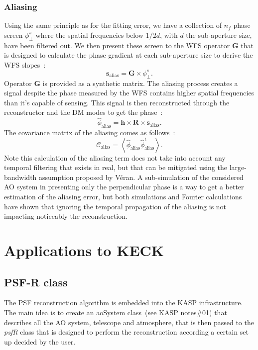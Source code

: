 \documentclass[12pt]{article}
\newcommand{\aver}[1]{\left\langle #1 \right\rangle}
\newcommand{\R}{\boldsymbol{\text{R}}}
\begin{document}
\subsubsection{Aliasing}
Using the same principle as for the fitting error, we have a collection of $n_f$ phase screen $\phi^s_\perp$ where the spatial frequencies below $1/2d$, with $d$ the sub-aperture size, have been filtered out. We then present these screen to the WFS operator $\boldsymbol{G}$ that is designed to calculate the phase gradient at each sub-aperture size to derive the WFS slopes~:
\begin{equation}
	\boldsymbol{s}_\text{alias} = \boldsymbol{G}\times\phi^s_\perp.
\end{equation}
Operator $\boldsymbol{G}$ is provided as a synthetic matrix. The aliasing process creates a signal despite the phase measured by the WFS contains higher spatial frequencies than it's capable of sensing. This signal is then reconstructed through the reconstructor and the DM modes to get the phase~:
\begin{equation}
\widehat{\phi}_\text{alias} = \boldsymbol{h} \times \R \times \boldsymbol{s}_\text{alias}.
\end{equation}
The covariance matrix of the aliasing comes as follows~:
\begin{equation}
\mathcal{C}_\text{alias}= \aver{\widehat{\phi}_{\text{alias}}\widehat{\phi}^t_{\text{alias}}}.
\end{equation}
Note this calculation of the aliasing term does not take into account any temporal filtering that exists in real, but that can be mitigated using the large-bandwidth assumption proposed by V\'eran. A sub-simulation of the considered AO system in presenting only the perpendicular phase is a way to get a better estimation of the aliasing error, but both simulations and Fourier calculations have shown that ignoring the temporal propagation of the aliasing is not impacting noticeably the reconstruction.
 
\section{Applications to KECK }
\subsection{PSF-R class}

The PSF reconstruction algorithm is embedded into the KASP infrastructure. The main idea is to create an aoSystem class~(see KASP notes\#01) that describes all the AO system, telescope and atmosphere, that is then passed to the \emph{psfR} class that is designed to perform the reconstruction according a certain set up decided by the user.
\end{document}
